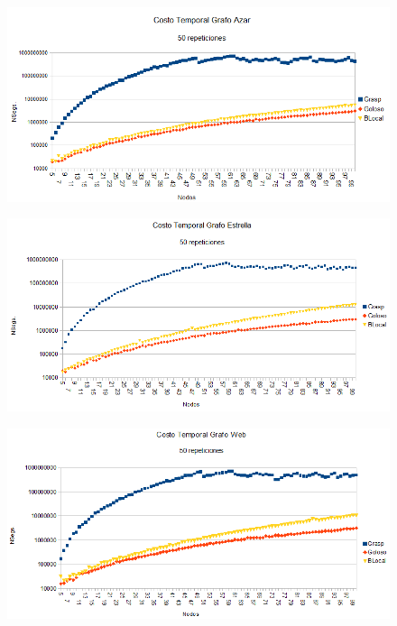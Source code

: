 \begin{figure}[H]
	\centering
	\includegraphics[scale=0.6]{timingAzar.png}
\end{figure}

\begin{figure}[H]
	\centering
	\includegraphics[scale=0.6]{timingStar.png}
\end{figure}

\begin{figure}[H]
	\centering
	\includegraphics[scale=0.6]{timingWeb.png}
\end{figure}

\quad

